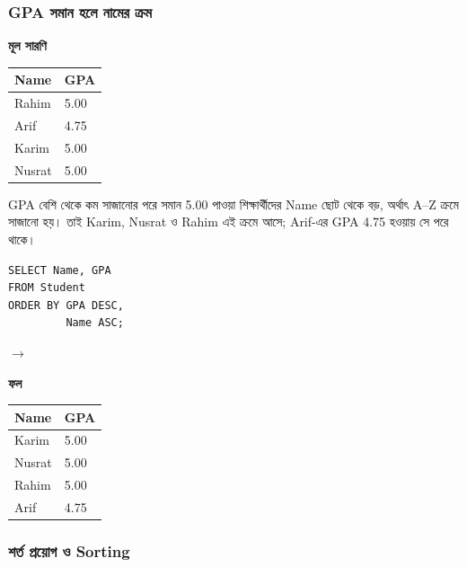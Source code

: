 \subsubsection{GPA সমান হলে নামের ক্রম}
\par\smallskip\noindent
\begin{minipage}[t]{.34\linewidth}\vspace{0pt}\raggedright
\small\textbf{মূল সারণি}

\begin{tabular}{|l|l|}
\hline
Name & GPA
\\ \hline
Rahim & 5.00
\\ \hline
Arif & 4.75
\\ \hline
Karim & 5.00
\\ \hline
Nusrat & 5.00
\\ \hline
\end{tabular}
\end{minipage}\hfill
\begin{minipage}[t]{.63\linewidth}\vspace{0pt}\raggedright
GPA বেশি থেকে কম সাজানোর পরে সমান 5.00 পাওয়া শিক্ষার্থীদের Name ছোট থেকে বড়, অর্থাৎ A--Z ক্রমে সাজানো হয়। তাই Karim, Nusrat ও Rahim এই ক্রমে আসে; Arif-এর GPA 4.75 হওয়ায় সে পরে থাকে।
\end{minipage}\par\smallskip
\par\smallskip\noindent\begin{minipage}[c]{.55\linewidth}
\begin{verbatim}
SELECT Name, GPA
FROM Student
ORDER BY GPA DESC,
         Name ASC;
\end{verbatim}
\end{minipage}\hfill\(\longrightarrow\)\hfill
\begin{minipage}[c]{.35\linewidth}\small\textbf{ফল}

\begin{tabular}{|l|l|}
\hline
Name & GPA
\\ \hline
Karim & 5.00
\\ \hline
Nusrat & 5.00
\\ \hline
Rahim & 5.00
\\ \hline
Arif & 4.75
\\ \hline
\end{tabular}
\end{minipage}\par\smallskip

\subsubsection{শর্ত প্রয়োগ ও Sorting}

